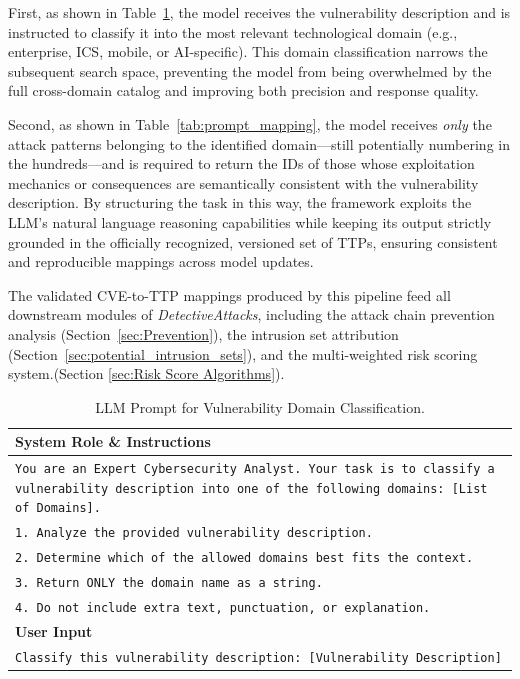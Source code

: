 \documentclass[conference]{IEEEtran}
\begin{document}
First, as shown in Table~\ref{tab:prompt_classification}, the model receives the vulnerability description and is instructed to classify it into the most relevant technological domain (e.g., enterprise, ICS, mobile, or AI-specific). This domain classification narrows the subsequent search space, preventing the model from being overwhelmed by the full cross-domain catalog and improving both precision and response quality. 

Second, as shown in Table~\ref{tab:prompt_mapping}, the model receives \textit{only} the attack patterns belonging to the identified domain—still potentially numbering in the hundreds—and is required to return the IDs of those whose exploitation mechanics or consequences are semantically consistent with the vulnerability description. By structuring the task in this way, the framework exploits the LLM's natural language reasoning capabilities while keeping its output strictly grounded in the officially recognized, versioned set of TTPs, ensuring consistent and reproducible mappings across model updates.

The validated CVE-to-TTP mappings produced by this pipeline feed all downstream modules of \textit{DetectiveAttacks}, including the attack chain prevention analysis (Section~\ref{sec:Prevention}), the intrusion set attribution (Section~\ref{sec:potential_intrusion_sets}), and the multi-weighted risk scoring system.(Section \ref{sec:Risk Score Algorithms}).

\begin{table}[htbp]
\caption{LLM Prompt for Vulnerability Domain Classification.}
\label{tab:prompt_classification}
\centering
\begin{tabular}{|p{}|}
\hline
\rowcolor[HTML]{EFEFEF} 
\textbf{System Role \& Instructions} \\ \hline
\small \texttt{You are an Expert Cybersecurity Analyst. Your task is to classify a vulnerability description into one of the following domains: [List of Domains].} \\
\small \texttt{1. Analyze the provided vulnerability description.} \\
\small \texttt{2. Determine which of the allowed domains best fits the context.} \\
\small \texttt{3. Return ONLY the domain name as a string.} \\
\small \texttt{4. Do not include extra text, punctuation, or explanation.} \\ \hline
\rowcolor[HTML]{EFEFEF} 
\textbf{User Input} \\ \hline
\small \texttt{Classify this vulnerability description: [Vulnerability Description]} \\ \hline
\end{tabular}
\end{table}
\end{document}

